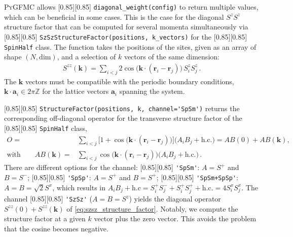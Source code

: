 \documentclass{SciPost}
\newcommand{\pyinline}[1]{\begingroup\setlength{\fboxsep}{0pt}%
  \colorbox{gray!15}{\raisebox{0pt}[0.85\ht\strutbox][0.85\dp\strutbox]{%
    \hspace{1pt}\lstinline{#1}\hspace{1pt}}}\endgroup}
\providecommand{\PyGFMC}{\textsc{PyGFMC}}
\begin{document}
\PyGFMC{} allows \pyinline{diagonal_weight(config)} to return multiple values, which can be beneficial in some cases.
%
This is the case for the diagonal $S^zS^z$ structure factor that can be computed for several momenta simultaneously via \pyinline{SzSzStructureFactor(positions, k_vectors)} for the \pyinline{SpinHalf} class.
%
The function takes the positions of the sites, given as an array of shape $(N,\mathrm{dim})$, and a selection of $k$ vectors of the same dimension:
\begin{align}
	S^{zz}(\mathbf{k})= \sum_{i<j} 2\cos\!\big(\mathbf{k}\cdot\left(\mathbf{r}_{i}-\mathbf{r}_{j}\right)\big)\,S^z_iS^z_j\,.\label{eq:szsz_structure_factor}
\end{align}
The $\mathbf{k}$ vectors must be compatible with the periodic boundary conditions, $\mathbf{k}\cdot\mathbf{a}_i\in 2\pi\mathbb{Z}$ for the lattice vectors $\mathbf{a}_i$ spanning the system.

\pyinline{StructureFactor(positions, k, channel='SpSm')} returns the corresponding off-diagonal operator for the transverse structure factor of the \pyinline{SpinHalf} class,
\begin{align}
	{O} =& \sum_{i<j}\Big[1+\cos\!\big(\mathbf{k}\cdot\left(\mathbf{r}_{i}-\mathbf{r}_{j}\right)\big)\Big]
	\Big(A_iB_j+\mathrm{h.c.}\Big)
	={AB}(0)+{AB}(\mathbf{k}),\\
	\mathrm{with }\qquad{AB}(\mathbf{k})=&\sum_{i<j}\cos\!\big(\mathbf{k}\cdot\left(\mathbf{r}_{i}-\mathbf{r}_{j}\right)\big)\Big(A_iB_j+\mathrm{h.c.}\Big)\,.
\end{align}
There are different options for the channel: \pyinline{'SpSm'}: $A=S^+$ and $B=S^-$; \pyinline{'SpSp'}: $A=S^+$ and $B=S^+$; \pyinline{'SpSm+SpSp'}: $A=B=\sqrt{2} S^x$, which results in $A_iB_j+\mathrm{h.c}=S^+_iS^-_j+S^+_iS^+_j+\mathrm{h.c.}=4S^x_iS^x_j$.
%
The channel \pyinline{'SzSz'} ($A=B=S^z$) yields the diagonal operator $S^{zz}(0)+S^{zz}(\mathbf{k})$ of \autoref{eq:szsz_structure_factor}.
%
Notably, we compute the structure factor at a given $k$ vector plus the zero vector.
%
This avoids the problem that the cosine becomes negative.\\
\end{document}
